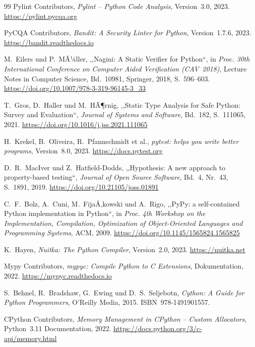 ﻿\documentclass[12pt,a4paper,twoside]{article}
\newcommand{\doi}[1]{\url{https://doi.org/#1}}
\begin{document}
\begin{thebibliography}{99}
  {Pylint Contributors},
  \textit{Pylint -- Python Code Analysis},
  Version~3.0, 2023.
  \url{https://pylint.pycqa.org}

  {PyCQA Contributors},
  \textit{Bandit: A Security Linter for Python},
  Version~1.7.6, 2023.
  \url{https://bandit.readthedocs.io}

  M.~Eilers und P.~MÃ¼ller,
  ,,Nagini: A Static Verifier for Python``,
  in \textit{Proc. 30th International Conference on Computer Aided
  Verification (CAV~2018)},
  Lecture Notes in Computer Science, Bd.~10981,
  Springer, 2018, S.~596--603.
  \doi{10.1007/978-3-319-96145-3\_33}

  T.~Gros, D.~Haller und M.~HÃ¶rnig,
  ,,Static Type Analysis for Safe Python: Survey and Evaluation``,
  \textit{Journal of Systems and Software},
  Bd.~182, S.~111065, 2021.
  \doi{10.1016/j.jss.2021.111065}

  H.~Krekel, B.~Oliveira, R.~Pfannschmidt et al.,
  \textit{pytest: helps you write better programs},
  Version~8.0, 2023.
  \url{https://docs.pytest.org}

  D.~R.~MacIver und Z.~Hatfield-Dodds,
  ,,Hypothesis: A new approach to property-based testing``,
  \textit{Journal of Open Source Software},
  Bd.~4, Nr.~43, S.~1891, 2019.
  \doi{10.21105/joss.01891}

  C.~F.~Bolz, A.~Cuni, M.~FijaÅ‚kowski und A.~Rigo,
  ,,PyPy: a self-contained Python implementation in Python``,
  in \textit{Proc. 4th Workshop on the Implementation, Compilation,
  Optimization of Object-Oriented Languages and Programming Systems},
  ACM, 2009.
  \doi{10.1145/1565824.1565825}

  K.~Hayen,
  \textit{Nuitka: The Python Compiler},
  Version~2.0, 2023.
  \url{https://nuitka.net}

  {Mypy Contributors},
  \textit{mypyc: Compile Python to C Extensions},
  Dokumentation, 2022.
  \url{https://mypyc.readthedocs.io}

  S.~Behnel, R.~Bradshaw, G.~Ewing und D.~S.~Seljebotn,
  \textit{Cython: A Guide for Python Programmers},
  O'Reilly Media, 2015.
  ISBN~978-1491901557.

  {CPython Contributors},
  \textit{Memory Management in CPython -- Custom Allocators},
  Python~3.11 Documentation, 2022.
  \url{https://docs.python.org/3/c-api/memory.html}


\end{thebibliography}
\end{document}
